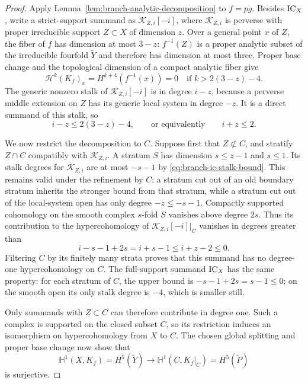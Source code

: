 \begin{proof}
Apply Lemma~\ref{lem:branch-analytic-decomposition} to $f=pg$.
Besides $\operatorname{IC}_X$, write a strict-support summand as
$\mathcal K_{Z,i}[-i]$, where $\mathcal K_{Z,i}$ is perverse with
proper irreducible support $Z\subset X$ of dimension $z$.  Over a
general point $x$ of $Z$, the fiber of $f$ has dimension at most $3-z$:
$f^{-1}(Z)$ is a proper analytic subset of the irreducible fourfold
$\widetilde Y$ and therefore has dimension at most three.  Proper base
change and the topological dimension of a compact analytic fiber give
\[
 \mathcal H^k(K_f)_x=H^{k+4}(f^{-1}(x))=0
               \quad\text{if }k>2(3-z)-4.
\]
The generic nonzero stalk of $\mathcal K_{Z,i}[-i]$ is in degree
$i-z$, because a perverse middle extension on $Z$ has its generic
local system in degree $-z$.  It is a direct summand of this stalk,
so
\begin{equation}\label{eq:branch-support-shift}
 i-z\leq2(3-z)-4,\qquad\text{or equivalently}\qquad i+z\leq2.
\end{equation}

We now restrict the decomposition to $C$.  Suppose first that
$Z\not\subset C$, and stratify $Z\cap C$ compatibly with
$\mathcal K_{Z,i}$.  A stratum $S$ has dimension $s\leq z-1$ and
$s\leq1$.  Its stalk degrees for $\mathcal K_{Z,i}$ are at most
$-s-1$ by \eqref{eq:branch-ic-stalk-bound}.  This remains valid under
the refinement by $C$: a stratum cut out of an old boundary stratum
inherits the stronger bound from that stratum, while a stratum cut
out of the local-system open has only degree $-z\leq-s-1$.
Compactly supported cohomology on the smooth complex $s$-fold $S$
vanishes above degree $2s$.  Thus its contribution to the
hypercohomology of $\mathcal K_{Z,i}[-i]|_C$ vanishes in degrees
greater than
\[
 i-s-1+2s=i+s-1\leq i+z-2\leq0.
\]
Filtering $C$ by its finitely many strata proves that this summand
has no degree-one hypercohomology on $C$.  The full-support summand
$\operatorname{IC}_X$ has the same property: for each stratum of $C$, the upper
bound is $-s-1+2s=s-1\leq0$; on the smooth open its only stalk degree
is $-4$, which is smaller still.

Only summands with $Z\subset C$ can therefore contribute in degree
one.  Such a complex is supported on the closed subset $C$, so its
restriction induces an isomorphism on hypercohomology from $X$ to
$C$.  The chosen global splitting and proper base change now show that
\[
 \mathbb H^1(X,K_f)=H^5(\widetilde Y)
   \longrightarrow
 \mathbb H^1(C,K_f|_C)=H^5(\widetilde P)
\]
is surjective.


\end{proof}
